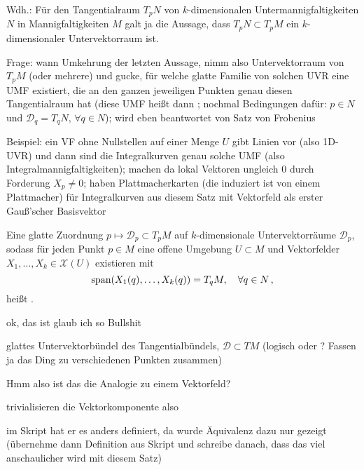 \documentclass[../H_Analysis_main.tex]{subfiles}
\begin{document}
Wdh.: Für den Tangentialraum $T_p N$ von $k$-dimensionalen Untermannigfaltigkeiten $N$ in Mannigfaltigkeiten $M$ galt ja die Aussage, dass $T_p N \subset T_p M$ ein $k$-dimensionaler Untervektorraum ist.

Frage: wann Umkehrung der letzten Aussage, nimm also Untervektorraum von $T_p M$ (oder mehrere) und gucke, für welche glatte Familie von solchen UVR eine UMF existiert, die an den ganzen jeweiligen Punkten genau diesen Tangentialraum hat (diese UMF heißt dann ; nochmal Bedingungen dafür: $p \in N$ und $\mathcal{D}_q = T_q N, \, \forall q \in N$); wird eben beantwortet von Satz von Frobenius

Beispiel: ein VF ohne Nullstellen auf einer Menge $U$ gibt Linien vor (also 1D-UVR) und dann sind die Integralkurven genau solche UMF (also Integralmannigfaltigkeiten); machen da lokal Vektoren ungleich 0 durch Forderung $X_p \neq 0$; haben Plattmacherkarten (die induziert ist von einem Plattmacher) für Integralkurven aus diesem Satz mit Vektorfeld als erster Gauß'scher Basisvektor


\begin{defi}[Distribution]
Eine glatte Zuordnung $p \mapsto \mathcal{D}_p \subset T_p M$ auf $k$-dimensionale Untervektorräume $\mathcal{D}_p$, sodass für jeden Punkt $p \in M$ eine offene Umgebung $U \subset M$ und Vektorfelder $X_1, \dots, X_k \in \mathcal{X}(U)$ existieren mit
\begin{equation}
\text{span} \qty(X_1(q), \dots, X_k(q)) = T_q M, \quad \forall q \in N \, ,
\end{equation}
heißt .
\end{defi}
ok, das ist glaub ich so Bullshit

glattes Untervektorbündel des Tangentialbündels, $\mathcal{D} \subset TM$ (logisch oder ? Fassen ja das Ding zu verschiedenen Punkten zusammen)

Hmm also ist das die Analogie zu einem Vektorfeld? 

trivialisieren die Vektorkomponente also

im Skript hat er es anders definiert, da wurde Äquivalenz dazu nur gezeigt (übernehme dann Definition aus Skript und schreibe danach, dass das viel anschaulicher wird mit diesem Satz)
\end{document}
